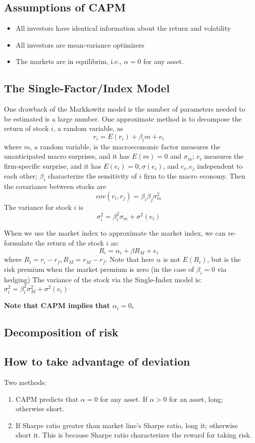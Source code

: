 \documentclass[a4paper,13pt]{report}
\begin{document}
\subsection{Assumptions of CAPM}
\begin{itemize}
    \item All investors have identical information about the return and volatility 
    \item All investors are mean-variance  optimizers
    \item The markets are in equilibrim, i.e., $\alpha = 0$ for any asset.
\end{itemize}


\subsection{The Single-Factor/Index Model}
One drawback of the Markkowitz model is the number of parameters needed to be estimated is a large number. One approximate method is to decompose the return of stock $i$, a random variable, as $$r_i = E(r_i) + \beta_i m + e_i$$
where $m$, a random variable, is the macroeconomic factor measures the unanticipated macro surprises, and it has $E(m) = 0$ and $\sigma_m$; $e_i$ measures the firm-specific surprise, and it has $E(e_i)=0,\sigma(e_i)$, and $e_i,e_j$ independent to each other; $\beta_i$ characterize the sensitivity of $i$ firm to the macro economy. 
Then the covariance between stocks are $$cov(r_i,r_j)=\beta_i\beta_j \sigma^2_m$$
The variance for stock $i$ is $$\sigma^2_i = \beta_i^2 \sigma_m + \sigma^2(e_i)$$

When we use the market index to approximate the market index, we can re-formulate the return of the stock $i$ as:
$$R_i = \alpha_i + \beta R_M + e_i$$
where $R_i = r_i - r_f, R_M=r_M - r_f$. Note that here $\alpha$ is not $E(R_i)$, but is the risk premium when the market premium is zero (in the case of $\beta_i = 0$ via hedging)
The variance of the stock via the Single-Index model is: $\sigma^2_i = \beta_i^2 \sigma^2_M + \sigma^2(e_i)$

\textbf{Note that CAPM implies that $\alpha_i = 0$.}

\subsection{Decomposition of risk}

\subsection{How to take advantage of deviation}
Two methods:
\begin{enumerate}
    \item CAPM predicts that $\alpha = 0$ for any asset. If $\alpha > 0$ for an asset, long; otherwise short.  
    \item If Sharpe ratio greater than market line's Sharpe ratio, long it; otherwise short it. This is because Sharpe ratio characterizes the reward for taking risk. 
\end{enumerate}
\end{document}
